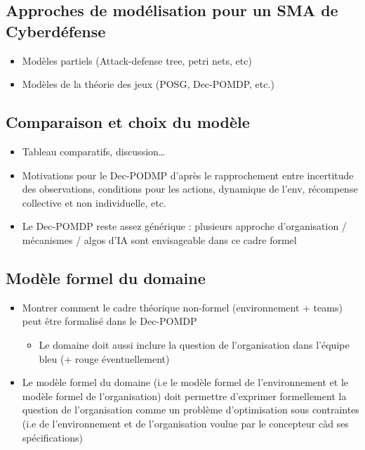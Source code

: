 \documentclass[runningheads]{llncs}
\begin{document}
\subsection{Approches de modélisation pour un SMA de Cyberdéfense}
\begin{itemize}

    \item Modèles partiels (Attack-defense tree, petri nets, etc)
    \item Modèles de la théorie des jeux (POSG, Dec-POMDP, etc.)
\end{itemize}

\subsection{Comparaison et choix du modèle}
\begin{itemize}

    \item Tableau comparatifs, discussion…
    \item Motivations pour le Dec-PODMP d’après le rapprochement entre incertitude des observations, conditions pour les actions, dynamique de l’env, récompense collective et non individuelle, etc.
    \item Le Dec-POMDP reste assez générique : plusieurs approche d’organisation / mécanismes / algos d’IA sont envisageable dans ce cadre formel
\end{itemize}

\subsection{Modèle formel du domaine}
\begin{itemize}

    \item Montrer comment le cadre théorique non-formel (environnement + teams) peut être formalisé dans le Dec-POMDP
          \begin{itemize}
              \item Le domaine doit aussi inclure la question de l'organisation dans l'équipe bleu (+ rouge éventuellement)
          \end{itemize}
    \item Le modèle formel du domaine (i.e le modèle formel de l'environnement et le modèle formel de l'organisation) doit permettre d'exprimer formellement la question de l'organisation comme un problème d'optimisation sous contraintes (i.e de l'environnement et de l'organisation voulue par le concepteur càd ses spécifications)
\end{itemize}
\end{document}

